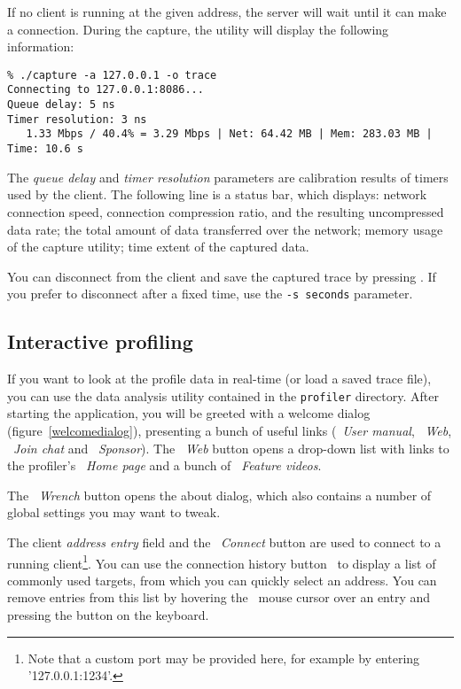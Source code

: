 \documentclass[hidelinks,titlepage,a4paper,twoside]{article}
\begin{document}
If no client is running at the given address, the server will wait until it can make a connection. During the capture, the utility will display the following information:

\begin{verbatim}
% ./capture -a 127.0.0.1 -o trace
Connecting to 127.0.0.1:8086...
Queue delay: 5 ns
Timer resolution: 3 ns
   1.33 Mbps / 40.4% = 3.29 Mbps | Net: 64.42 MB | Mem: 283.03 MB | Time: 10.6 s
\end{verbatim}

The \emph{queue delay} and \emph{timer resolution} parameters are calibration results of timers used by the client. The following line is a status bar, which displays: network connection speed, connection compression ratio, and the resulting uncompressed data rate; the total amount of data transferred over the network; memory usage of the capture utility; time extent of the captured data.

You can disconnect from the client and save the captured trace by pressing . If you prefer to disconnect after a fixed time, use the \texttt{-s seconds} parameter.

\subsection{Interactive profiling}
\label{interactiveprofiling}

If you want to look at the profile data in real-time (or load a saved trace file), you can use the data analysis utility contained in the \texttt{profiler} directory. After starting the application, you will be greeted with a welcome dialog (figure~\ref{welcomedialog}), presenting a bunch of useful links (\faBook{}~\emph{User manual}, \faGlobeAmericas{}~\emph{Web}, \faComment~\emph{Join chat} and \faHeart{}~\emph{Sponsor}). The \faGlobeAmericas{}~\emph{Web} button opens a drop-down list with links to the profiler's \emph{\faHome{}~Home page} and a bunch of \emph{\faVideo{}~Feature videos}.

The \emph{\faWrench{}~Wrench} button opens the about dialog, which also contains a number of global settings you may want to tweak.

The client \emph{address entry} field and the \faWifi{}~\emph{Connect} button are used to connect to a running client\footnote{Note that a custom port may be provided here, for example by entering '127.0.0.1:1234'.}. You can use the connection history button~\faCaretDown{} to display a list of commonly used targets, from which you can quickly select an address. You can remove entries from this list by hovering the \faMousePointer{}~mouse cursor over an entry and pressing the \keys{\del} button on the keyboard.
\end{document}
